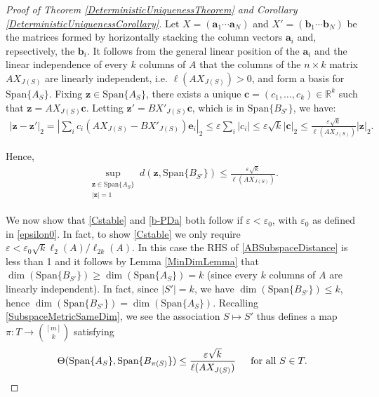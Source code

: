 \documentclass[journal, onecolumn]{IEEEtran}
\begin{document}
\begin{proof}[Proof of Theorem \ref{DeterministicUniquenessTheorem} and Corollary \ref{DeterministicUniquenessCorollary}]
Let $X = (\mathbf{a}_1 \cdots \mathbf{a}_N)$ and $X' = (\mathbf{b}_1 \cdots \mathbf{b}_N)$ be the matrices formed by horizontally stacking the column vectors $\mathbf{a}_i$ and, repsectively, the $\mathbf{b}_i$. It follows from the general linear position of the $\mathbf{a}_i$ and the linear independence of every $k$ columns of $A$ that the columns of the $n \times k$ matrix $AX_{J(S)}$ are linearly independent, i.e. $\ell(AX_{J(S)}) > 0$, and form a basis for $\text{Span}\{A_{S}\}$. Fixing $\mathbf{z} \in \text{Span}\{A_{S}\}$, there exists a unique $\mathbf{c} = (c_1, \ldots, c_k) \in \mathbb{R}^k$ such that $\mathbf{z} = AX_{J(S)}\mathbf{c}$. Letting $\mathbf{z'} = BX'_{J(S)}\mathbf{c}$, which is in $\text{Span}\{B_{S'}\}$, we have:
\begin{align*}
|\mathbf{z} - \mathbf{z'}|_2 = |\sum_ic_i(AX_{J(S)} - BX'_{J(S)})\mathbf{e}_i|_2 
\leq \varepsilon \sum_i |c_i| 
\leq \varepsilon \sqrt{k} |\mathbf{c}|_2 
\leq \frac{\varepsilon \sqrt{k}}{\ell(AX_{J(S)})} |\mathbf{z}|_2.
\end{align*}

Hence,
\begin{align}\label{ABSubspaceDistance}
\sup_{ \substack{ \mathbf{z} \in \text{Span}\{A_{S}\} \\ |\mathbf{z}| = 1} } d(\mathbf{z}, \text{Span}\{B_{S'}\}) \leq \frac{\varepsilon\sqrt{k}}{\ell(AX_{J(S)})}.
\end{align}

We now show that \eqref{Cstable} and \eqref{b-PDa} both follow if $\varepsilon < \varepsilon_0$, with $\varepsilon_0$ as defined in \eqref{epsilon0}. In fact, to show \eqref{Cstable} we only require $\varepsilon <  \varepsilon_0 \sqrt{k} \ell_2(A)/\ell_{2k}(A)$. In this case the RHS of \eqref {ABSubspaceDistance} is less than 1 and it follows by Lemma \ref{MinDimLemma} that $\dim(\text{Span}\{B_{S'}\}) \geq \dim(\text{Span}\{A_{S}\}) = k$ (since every $k$ columns of $A$ are linearly independent). In fact, since $|S'| = k$, we have $\dim(\text{Span}\{B_{S'}\}) \leq k$, hence $\dim(\text{Span}\{B_{S'}\}) = \dim(\text{Span}\{A_{S}\})$. Recalling \eqref{SubspaceMetricSameDim},  we see the association $S \mapsto S'$ thus defines a map $\pi: T \to {[m] \choose k}$ satisfying
\begin{align}\label{yeyeye}
\Theta(\text{Span}\{A_{S}\}, \text{Span}\{B_{\pi(S)}\}) \leq \frac{\varepsilon\sqrt{k}}{\ell(AX_{J(S)})} \indent \text{for all } S \in T.
\end{align}


\end{proof}
\end{document}
